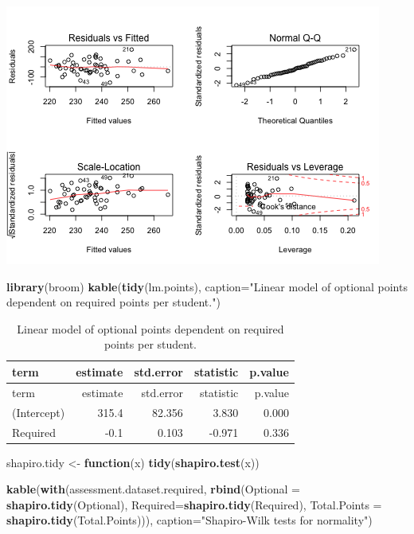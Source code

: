 \documentclass[]{article}
\newenvironment{Shaded}{\begin{snugshade}}{\end{snugshade}}
\newcommand{\KeywordTok}[1]{\textcolor[rgb]{0.13,0.29,0.53}{\textbf{#1}}}
\newcommand{\DataTypeTok}[1]{\textcolor[rgb]{0.13,0.29,0.53}{#1}}
\newcommand{\StringTok}[1]{\textcolor[rgb]{0.31,0.60,0.02}{#1}}
\newcommand{\ControlFlowTok}[1]{\textcolor[rgb]{0.13,0.29,0.53}{\textbf{#1}}}
\newcommand{\NormalTok}[1]{#1}
\begin{document}
\includegraphics{figures/required-optional-correlations-1.png}

\begin{Shaded}
\begin{Highlighting}[]
\KeywordTok{library}\NormalTok{(broom)}
\KeywordTok{kable}\NormalTok{(}\KeywordTok{tidy}\NormalTok{(lm.points), }\DataTypeTok{caption=}\StringTok{"Linear model of optional points dependent on required points per student."}\NormalTok{)}
\end{Highlighting}
\end{Shaded}

\begin{longtable}[]{@{}lrrrr@{}}
\caption{Linear model of optional points dependent on required points
per student.}\tabularnewline
\toprule
term & estimate & std.error & statistic & p.value\tabularnewline
\midrule
\endfirsthead
\toprule
term & estimate & std.error & statistic & p.value\tabularnewline
\midrule
\endhead
(Intercept) & 315.4 & 82.356 & 3.830 & 0.000\tabularnewline
Required & -0.1 & 0.103 & -0.971 & 0.336\tabularnewline
\bottomrule
\end{longtable}

\begin{Shaded}
\begin{Highlighting}[]
\NormalTok{shapiro.tidy <-}\StringTok{ }\ControlFlowTok{function}\NormalTok{(x) }\KeywordTok{tidy}\NormalTok{(}\KeywordTok{shapiro.test}\NormalTok{(x))}

\KeywordTok{kable}\NormalTok{(}\KeywordTok{with}\NormalTok{(assessment.dataset.required, }\KeywordTok{rbind}\NormalTok{(}\DataTypeTok{Optional =} \KeywordTok{shapiro.tidy}\NormalTok{(Optional), }
                                              \DataTypeTok{Required=}\KeywordTok{shapiro.tidy}\NormalTok{(Required),}
                                              \DataTypeTok{Total.Points =} \KeywordTok{shapiro.tidy}\NormalTok{(Total.Points))), }\DataTypeTok{caption=}\StringTok{"Shapiro-Wilk tests for normality"}\NormalTok{)}
\end{Highlighting}
\end{Shaded}
\end{document}
